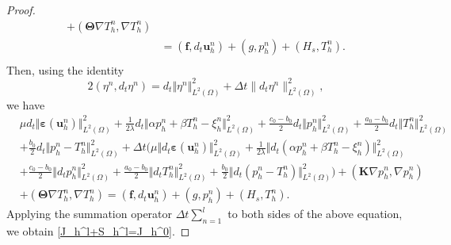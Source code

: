 \documentclass{article}
\numberwithin{equation}{section}
\begin{document}
\begin{proof}
\begin{equation}
\begin{aligned}
  +(\bm\Theta\nabla T_h^n,\nabla T_h^n)\\
&= (\bm f,d_t\bm u_h^n) + (g,p_h^n) + ( H_{s},T_h^n).\\
\end{aligned}
\end{equation}
Then, using the identity
\begin{equation}\label{2x xt=dt x^2+dtx^2}
 2(\eta^n,d_t \eta^n)=d_t\Vert\eta^n\Vert_{L^2(\Omega)}^2
                       +\Delta t\|d_t\eta^n\|_{L^2(\Omega)}^2,
\end{equation}
we have
\begin{equation}    
\begin{aligned} 
& \mu d_t\Vert\bm\varepsilon(\bm u_h^n)\Vert_{L^2(\Omega)}^2  
  +\frac1{2\lambda}d_t\Vert\alpha p_h^n+\beta T_h^n-\xi_h^n\Vert_{L^2(\Omega)}^2
  +\frac{c_0-b_0}{2}d_t\Vert p_h^n\Vert_{L^2(\Omega)}^2  
 +\frac{a_0-b_0}{2}d_t\Vert T_h^n\Vert_{L^2(\Omega)}^2 \\
&+\frac{b_0}{2}d_t\Vert p_h^n-T_h^n\Vert_{L^2(\Omega)}^2  
+\Delta t\Big(\mu\Vert d_t\bm\varepsilon(\bm u_h^n)\Vert_{L^2(\Omega)}^2
+\frac1{2\lambda}\Vert d_t(\alpha p_h^n+\beta T_h^n-\xi_h^n)\Vert_{L^2(\Omega)}^2\\
 & +\frac{c_0-b_0}{2}\Vert d_t p_h^n\Vert_{L^2(\Omega)}^2 
  +\frac{a_0-b_0}{2}\Vert d_t T_h^n\Vert_{L^2(\Omega)}^2
  +\frac{b_0}{2}\Vert d_t( p_h^n-T_h^n)\Vert_{L^2(\Omega)}^2 \Big) 
  + (\bm K \nabla p_h^n,\nabla p_h^n) \\
 &+(\bm\Theta\nabla T_h^n,\nabla T_h^n)=   (\bm f,d_t\bm u_h^n) + (g,p_h^n) + ( H_{s},T_h^n).
\end{aligned}
\end{equation}
Applying the summation operator $\Delta t\sum_{n=1}^l$ to both sides of the above equation, we obtain \eqref{J_h^l+S_h^l=J_h^0}. 
\end{proof}
\end{document}
